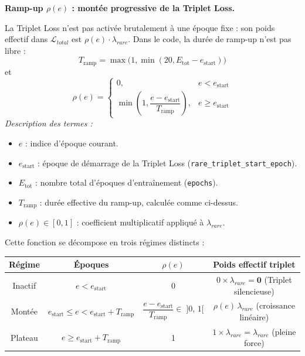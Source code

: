 \documentclass[11pt,a4paper]{article}
\begin{document}
\textbf{Ramp-up $\rho(e)$ : mont\'ee progressive de la Triplet Loss.}

La Triplet Loss n'est pas activ\'ee brutalement \`a une \'epoque fixe : son poids effectif dans $\mathcal{L}_{total}$ est $\rho(e)\cdot\lambda_{rare}$. Dans le code, la dur\'ee de ramp-up n'est pas libre :
\[
  T_{\text{ramp}}=\max\!\bigl(1,\min(20,E_{\text{tot}}-e_{\text{start}})\bigr)
\]
et
\[
  \rho(e)=
  \begin{cases}
    0, & e<e_{\text{start}}\\
    \min\!\left(1,\dfrac{e-e_{\text{start}}}{T_{\text{ramp}}}\right), & e\ge e_{\text{start}}
  \end{cases}
\]
\textit{Description des termes :}
\begin{itemize}[nosep]
  \item $e$ : indice d'\'epoque courant.
  \item $e_{\text{start}}$ : \'epoque de d\'emarrage de la Triplet Loss (\texttt{rare\_triplet\_start\_epoch}).
  \item $E_{\text{tot}}$ : nombre total d'\'epoques d'entra\^inement (\texttt{epochs}).
  \item $T_{\text{ramp}}$ : dur\'ee effective du ramp-up, calcul\'ee comme ci-dessus.
  \item $\rho(e) \in [0,1]$ : coefficient multiplicatif appliqu\'e \`a $\lambda_{rare}$.
\end{itemize}

Cette fonction se d\'ecompose en trois r\'egimes distincts :

\begin{center}
\renewcommand{\arraystretch}{1.25}
\begin{tabular}{c c c c}
\toprule
\textbf{R\'egime} & \textbf{\'Epoques} & \textbf{$\rho(e)$} & \textbf{Poids effectif triplet} \\
\midrule
Inactif & $e < e_{\text{start}}$ & 0 & $0 \times \lambda_{rare} = \mathbf{0}$ (Triplet silencieuse) \\
Mont\'ee & $e_{\text{start}} \le e < e_{\text{start}} + T_{\text{ramp}}$ & $\dfrac{e-e_{\text{start}}}{T_{\text{ramp}}} \in\; ]0,\,1[$ & $\rho(e)\,\lambda_{rare}$ (croissance lin\'eaire) \\
Plateau & $e \ge e_{\text{start}} + T_{\text{ramp}}$ & 1 & $1 \times \lambda_{rare} = \lambda_{rare}$ (pleine force) \\
\bottomrule
\end{tabular}
\end{center}
\end{document}
